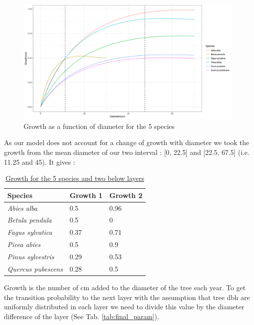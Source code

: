 \documentclass{article}
\begin{document}
\begin{figure}
    \centering
    \includegraphics[width=\textwidth]{Figure/Parametrisation/Growth_diameter.png}
    \caption{Growth as a function of diameter for the 5 species}
    \label{fig:growth_diameter}
\end{figure}

As our model does not account for a change of growth with diameter we took the growth from the mean diameter of our two interval : [0, 22.5] and [22.5, 67.5] (i.e. 11.25 and 45). It gives :

\begin{table}[H]
\begin{center}
    \begin{tabular}{lll}
    \hline
    Species & Growth 1 & Growth 2 \\ \hline
    \textit{Abies alba} & 0.5 & 0.96 \\
    \textit{Betula pendula} & 0.5 & 0 \\
    \textit{Fagus sylvatica} & 0.37 & 0.71 \\
    \textit{Picea abies} & 0.5 & 0.9 \\
    \textit{Pinus sylvestris} & 0.29 & 0.53 \\
    \textit{Quercus pubescens} & 0.28 & 0.5 \\ \hline
    \end{tabular}
    \caption{\underline{Growth for the 5 species and two below layers}}
\end{center}
\end{table}

Growth is the number of cm added to the diameter of the tree each year. To get the transition probability to the next layer with the assumption that tree dbh are uniformly distributed in each layer we need to divide this value by the diameter difference of the layer (See Tab. \ref{tab:final_param}).
\end{document}
